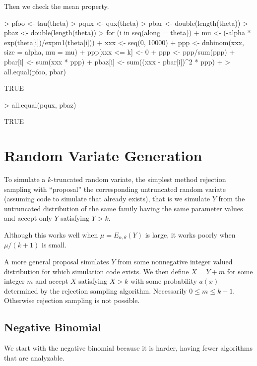 \documentclass[11pt]{article}
\begin{document}
Then we check the mean property.
\begin{Schunk}
\begin{Sinput}
> pfoo <- tau(theta)
> pqux <- qux(theta)
> pbar <- double(length(theta))
> pbaz <- double(length(theta))
> for (i in seq(along = theta)) {
+     mu <- (-alpha * exp(theta[i])/expm1(theta[i]))
+     xxx <- seq(0, 10000)
+     ppp <- dnbinom(xxx, size = alpha, mu = mu)
+     ppp[xxx <= k] <- 0
+     ppp <- ppp/sum(ppp)
+     pbar[i] <- sum(xxx * ppp)
+     pbaz[i] <- sum((xxx - pbar[i])^2 * ppp)
+ }
> all.equal(pfoo, pbar)
\end{Sinput}
\begin{Soutput}
[1] TRUE
\end{Soutput}
\begin{Sinput}
> all.equal(pqux, pbaz)
\end{Sinput}
\begin{Soutput}
[1] TRUE
\end{Soutput}
\end{Schunk}

\section{Random Variate Generation}

To simulate a $k$-truncated random variate, the simplest method rejection
sampling with ``proposal'' the corresponding untruncated random variate
(assuming code to simulate that already exists), that is we simulate $Y$
from the untruncated distribution of the same family having the same
parameter values and accept only $Y$ satisfying $Y > k$.

Although this works well when $\mu = E_{\alpha, \theta}(Y)$ is large,
it works poorly when $\mu / (k + 1)$ is small.

A more general proposal simulates $Y$ from some nonnegative integer valued
distribution for which
simulation code exists.  We then define $X = Y + m$ for some integer $m$
and accept $X$ satisfying $X > k$ with some probability $a(x)$ determined
by the rejection sampling algorithm.
Necessarily $0 \le m \le k + 1$.  Otherwise rejection sampling is
not possible.

\subsection{Negative Binomial}

We start with the negative binomial because it is harder,
having fewer algorithms that are analyzable.
\end{document}
